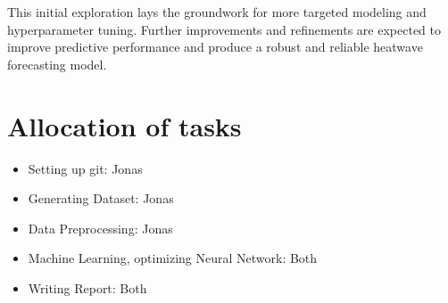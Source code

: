 \documentclass[8pt,a4paper]{article}
\begin{document}
This initial exploration lays the groundwork for more targeted modeling and hyperparameter tuning. Further improvements and refinements are expected to improve predictive performance and produce a robust and reliable heatwave forecasting model.

\section{Allocation of tasks}
\begin{itemize}
\item Setting up git: Jonas
\item Generating Dataset: Jonas
\item Data Preprocessing: Jonas
\item Machine Learning, optimizing Neural Network: Both
\item Writing Report: Both
\end{itemize}
\end{document}
